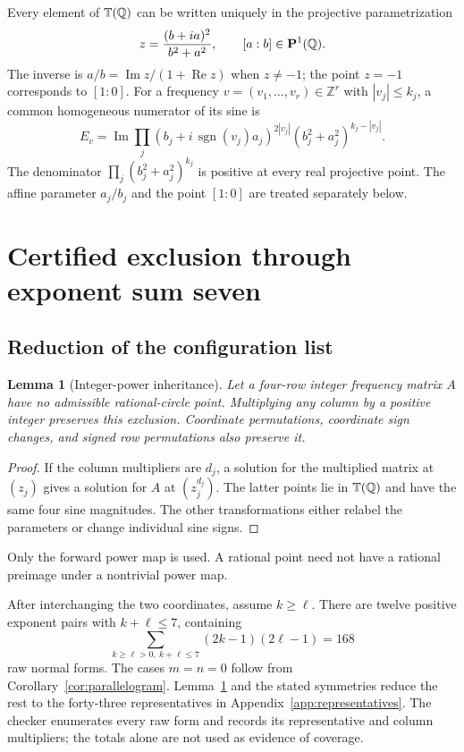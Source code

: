 \documentclass[11pt,letterpaper]{article}
\newtheorem{lemma}[theorem]{Lemma}
\theoremstyle{definition}\newtheorem{definition}[theorem]{Definition}
\theoremstyle{remark}\newtheorem{remark}[theorem]{Remark}
\newcommand{\Q}{\mathbb Q}\newcommand{\Z}{\mathbb Z}\newcommand{\R}{\mathbb R}
\newcommand{\im}{\operatorname{Im}}\newcommand{\Res}{\operatorname{Res}}
\begin{document}
Every element of $\T(\Q)$ can be written uniquely in the projective parametrization
\begin{equation}\label{eq:circleparam}
 z=\frac{(b+ia)^2}{b^2+a^2},\qquad[a:b]\in\PP(\Q).
\end{equation}
The inverse is $a/b=\im z/(1+\operatorname{Re}z)$ when $z\ne-1$; the point $z=-1$ corresponds to $[1:0]$. For a frequency $v=(v_1,\ldots,v_r)\in\Z^r$ with $|v_j|\le k_j$, a common homogeneous numerator of its sine is
\begin{equation}\label{eq:homogeneous}
 E_v=\im\prod_j
 (b_j+i\,\operatorname{sgn}(v_j)a_j)^{2|v_j|}
 (b_j^2+a_j^2)^{k_j-|v_j|}.
\end{equation}
The denominator $\prod_j(b_j^2+a_j^2)^{k_j}$ is positive at every real projective point. The affine parameter $a_j/b_j$ and the point $[1:0]$ are treated separately below.

\section{Certified exclusion through exponent sum seven}\label{sec:two}
\subsection{Reduction of the configuration list}
\begin{lemma}[Integer-power inheritance]\label{lem:inherit}
Let a four-row integer frequency matrix $A$ have no admissible rational-circle point. Multiplying any column by a positive integer preserves this exclusion. Coordinate permutations, coordinate sign changes, and signed row permutations also preserve it.
\end{lemma}
\begin{proof}
If the column multipliers are $d_j$, a solution for the multiplied matrix at $(z_j)$ gives a solution for $A$ at $(z_j^{d_j})$. The latter points lie in $\T(\Q)$ and have the same four sine magnitudes. The other transformations either relabel the parameters or change individual sine signs.
\end{proof}
Only the forward power map is used. A rational point need not have a rational preimage under a nontrivial power map.

After interchanging the two coordinates, assume $k\ge\ell$. There are twelve positive exponent pairs with $k+\ell\le7$, containing
\[
 \sum_{k\ge\ell>0,\ k+\ell\le7}(2k-1)(2\ell-1)=168
\]
raw normal forms. The cases $m=n=0$ follow from Corollary~\ref{cor:parallelogram}. Lemma~\ref{lem:inherit} and the stated symmetries reduce the rest to the forty-three representatives in Appendix~\ref{app:representatives}. The checker enumerates every raw form and records its representative and column multipliers; the totals alone are not used as evidence of coverage.
\end{document}
